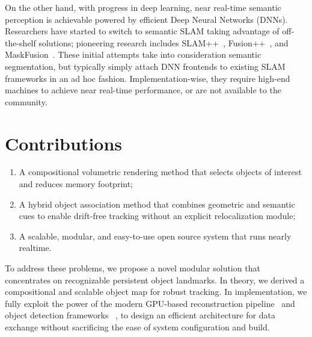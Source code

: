 On the other hand, with progress in deep learning, near real-time semantic perception is achievable powered by efficient Deep Neural Networks (DNNs).
Researchers have started to switch to semantic SLAM taking advantage of off-the-shelf solutions; pioneering research includes SLAM++~\cite{salas-morenoSLAMSimultaneousLocalisation2013}, Fusion++~\cite{mccormacFusionVolumetricObjectLevel2018}, and MaskFusion~\cite{runzMaskFusionRealTimeRecognition2018}. These initial attempts take into consideration semantic segmentation, but typically simply attach DNN frontends to existing SLAM frameworks in an ad hoc fashion. Implementation-wise, they require high-end machines to achieve near real-time performance, or are not available to the community.

\section{Contributions}

\begin{enumerate}
    \item A compositional volumetric rendering method that selects objects of interest and reduces memory footprint;
    \item A hybrid object association method that combines geometric and semantic cues to enable drift-free tracking without an explicit relocalization module;
    \item A scalable, modular, and easy-to-use open source system that runs nearly realtime.
\end{enumerate}

To address these problems, we propose a novel modular solution that concentrates on recognizable persistent object landmarks. In theory, we derived a compositional and scalable object map for robust tracking. In implementation, we fully exploit the power of the modern GPU-based reconstruction pipeline~\cite{dong2019gpu} and object detection frameworks ~\cite{kirillov_pointrend_2020}, to design an efficient architecture for data exchange without sacrificing the ease of system configuration and build.

